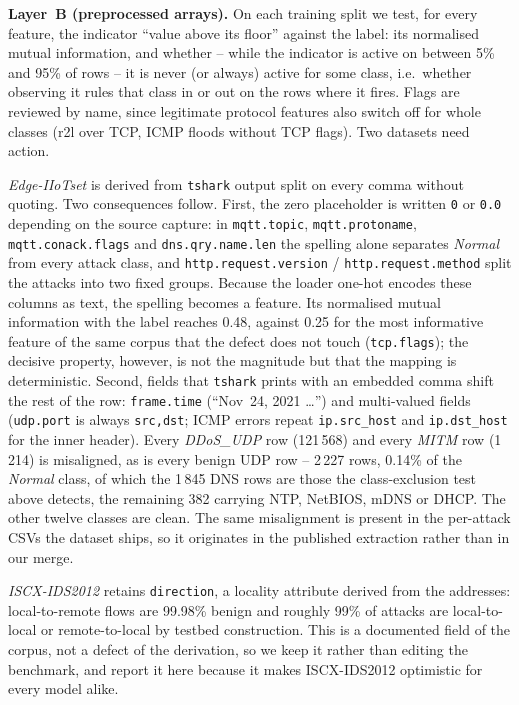 \textbf{Layer~B (preprocessed arrays).} On each training split we test, for every
feature, the indicator ``value above its floor'' against the label: its
normalised mutual information, and whether -- while the indicator is active on
between 5\% and 95\% of rows -- it is never (or always) active for some class,
i.e.\ whether observing it rules that class in or out on the rows where it fires. Flags are reviewed by name, since legitimate protocol features
also switch off for whole classes (r2l over TCP, ICMP floods without TCP flags).
Two datasets need action.

\emph{Edge-IIoTset} is derived from \texttt{tshark} output split on every comma
without quoting. Two consequences follow. First, the zero placeholder is written
\texttt{0} or \texttt{0.0} depending on the source capture: in
\texttt{mqtt.topic}, \texttt{mqtt.protoname}, \texttt{mqtt.conack.flags} and
\texttt{dns.qry.name.len} the spelling alone separates \emph{Normal} from every
attack class, and \texttt{http.request.version} / \texttt{http.request.method}
split the attacks into two fixed groups. Because the loader one-hot encodes these
columns as text, the spelling becomes a feature. Its normalised mutual
information with the label reaches 0.48, against 0.25 for the most informative
feature of the same corpus that the defect does not touch (\texttt{tcp.flags});
the decisive property, however, is not the magnitude but that the mapping is
deterministic.
Second, fields that \texttt{tshark} prints with an embedded comma shift the rest
of the row: \texttt{frame.time} (``Nov~24, 2021 \ldots'') and multi-valued fields
(\texttt{udp.port} is always \texttt{src,dst}; ICMP errors repeat
\texttt{ip.src\_host} and \texttt{ip.dst\_host} for the inner header). Every
\emph{DDoS\_UDP} row (121\,568) and every \emph{MITM} row (1\,214) is misaligned,
as is every benign UDP row -- 2\,227 rows, 0.14\% of the \emph{Normal} class, of
which the 1\,845 DNS rows are those the class-exclusion test above detects, the
remaining 382 carrying NTP, NetBIOS, mDNS or DHCP. The other twelve classes are
clean. The
same misalignment is present in the per-attack CSVs the dataset ships, so it
originates in the published extraction rather than in our merge.

\emph{ISCX-IDS2012} retains \texttt{direction}, a locality attribute derived from
the addresses: local-to-remote flows are 99.98\% benign and roughly 99\% of
attacks are local-to-local or remote-to-local by testbed construction. This is a
documented field of the corpus, not a defect of the derivation, so we keep it
rather than editing the benchmark, and report it here because it makes
ISCX-IDS2012 optimistic for every model alike.

